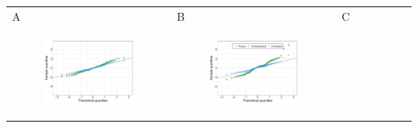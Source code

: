 \documentclass[11pt]{article}
\begin{document}
\begin{suppfigure}[ht]
	\begin{tabular}{lll}
	A&B&C\\
	\begin{subfigure}[t]{0.3\linewidth}
		\centering
		\includegraphics[width=1\linewidth]{figs/figure-5a.pdf} 
	\end{subfigure}&
	\begin{subfigure}[t]{0.3\linewidth}
		\centering
		\includegraphics[width=1\linewidth]{figs/figure-5b.pdf}
	\end{subfigure}&
	\begin{subfigure}[t]{0.3\linewidth}
		\centering

\end{subfigure}
\end{tabular}
\end{suppfigure}
\end{document}
